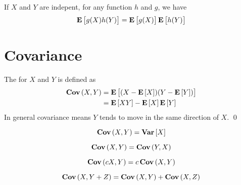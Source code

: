 \begin{theorem}
    If $X$ and $Y$ are indepent, for any function $h$ and $g$, we have
    \begin{equation}
        \expect{g(X) h(Y)} = \expect{g(X)} \expect{h(Y)}
    \end{equation}    
\end{theorem}

\section{Covariance}

\begin{definition}[covariance]
    The  for $X$ and $Y$ is defined as 
    \begin{equation}
    \begin{aligned}
        \covariance{X}{Y} &= \expect{(X - \expect{X})(Y - \expect{Y})} \\
        &= \expect{XY} - \expect{X} \expect{Y}
    \end{aligned}
    \end{equation}
    In general covariance means $Y$ tends to move in the same direction of $X$.
    \qed
\end{definition}

\begin{theorem}
    \begin{equation}
        \covariance{X}{Y} = \variance{X}
    \end{equation}    
\end{theorem}

\begin{theorem}
    \begin{equation}
        \covariance{X}{Y} = \covariance{Y}{X}
    \end{equation}    
\end{theorem}

\begin{theorem}
    \begin{equation}
        \covariance{cX}{Y} = c \covariance{X}{Y}
    \end{equation}    
\end{theorem}

\begin{theorem}
    \begin{equation}
        \covariance{X}{Y + Z} = \covariance{X}{Y} + \covariance{X}{Z}
    \end{equation}    
\end{theorem}

